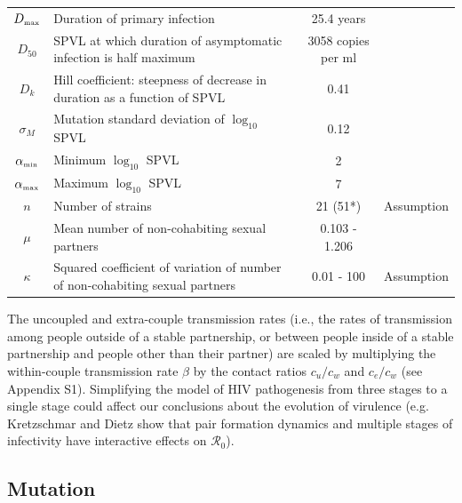 \documentclass[10pt,letterpaper]{article}
\newcommand{\rzero}{{\mathcal R}_0}
\newcommand{\tsub}[2]{#1_{{\textrm{\tiny #2}}}}
\begin{document}
\begin{table}[h!]
\begin{tabular}{c p{2in} c l}
$\tsub{D}{max}$ & Duration of primary infection & 25.4 years & \cite{shirreff_transmission_2011} \\
$D_{50}$ & SPVL at which duration of asymptomatic infection is half maximum & 3058 copies per ml & \cite{shirreff_transmission_2011} \\
$D_{k}$ & Hill coefficient: steepness of decrease in duration as a function of SPVL & 0.41 & \cite{shirreff_transmission_2011} \\
$\sigma_M$ & Mutation standard deviation of $\log_{10}$ SPVL & 0.12 & \cite{shirreff_transmission_2011} \\
$\tsub{\alpha}{min}$ & Minimum $\log_{10}$ SPVL & 2 & \cite{shirreff_transmission_2011}\\
$\tsub{\alpha}{max}$ & Maximum $\log_{10}$ SPVL & 7 & \cite{shirreff_transmission_2011}\\
$n$ & Number of strains & 21 (51*) & Assumption\\
$\mu$ & Mean number of non-cohabiting sexual partners & 0.103 - 1.206 & \cite{omori2015dynamics}\\
$\kappa$ & Squared coefficient of variation of number of non-cohabiting sexual partners & 0.01 - 100 & Assumption\\
\hline
\end{tabular}
\label{table:parmsTable}
\end{table}

The uncoupled and extra-couple transmission rates (i.e., the rates of
transmission among people outside of a stable partnership, or between
people inside of a stable partnership and people other than their
partner) are scaled by
multiplying the within-couple transmission rate $\beta$ by the contact
ratios $c_u/c_w$ and $c_e/c_w$ (see Appendix S1). Simplifying the model
of HIV pathogenesis from three stages to a single stage could affect
our conclusions about the evolution of virulence (e.g. Kretzschmar and
Dietz \cite{kretzschmar_effect_1998} show that pair formation dynamics
and multiple stages of infectivity have interactive effects on
$\rzero$). 

\subsection*{Mutation}
\end{document}
